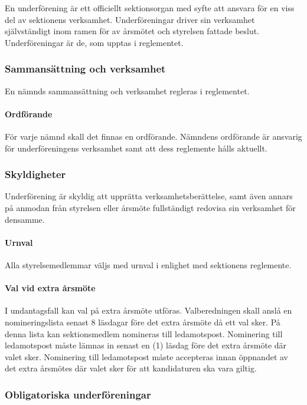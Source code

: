 \documentclass{dgovdoc}
\begin{document}
En underförening är ett officiellt sektionsorgan med syfte att ansvara för en viss del
av sektionens verksamhet. Underföreningar driver sin verksamhet självständigt inom
ramen för av årsmötet och styrelsen fattade beslut. Underföreningar är de, som upptas i
reglementet.

\subsubsection{Sammansättning och verksamhet}

En nämnds sammansättning och verksamhet regleras i reglementet.

\paragraph{Ordförande}

För varje nämnd skall det finnas en ordförande.
Nämndens ordförande är ansvarig för underföreningens verksamhet samt att dess
reglemente hålls aktuellt.

\subsubsection{Skyldigheter}

Underförening är skyldig att upprätta verksamhetsberättelse, samt även annars på
anmodan från styrelsen eller årsmöte fullständigt redovisa sin verksamhet för
densamme.

\paragraph{Urnval}

Alla styrelsemedlemmar väljs med urnval i enlighet med sektionens
reglemente.

\paragraph{Val vid extra årsmöte}

I undantagsfall kan val på extra årsmöte utföras. Valberedningen skall anslå
en nomineringslista senast 8 läsdagar före det extra årsmöte då ett val sker. På denna lista
kan sektionsmedlem nomineras till ledamotspost. Nominering till ledamotspost
måste lämnas in senast en (1) läsdag före det extra årsmöte där valet sker. Nominering till
ledamotspost måste accepteras innan öppnandet av det extra årsmötes där valet sker för
att kandidaturen ska vara giltig.

\subsubsection{Obligatoriska underföreningar}
\end{document}
